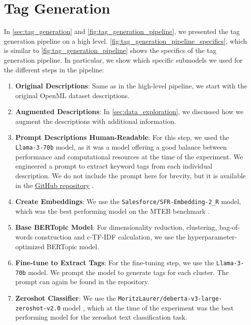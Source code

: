 \section{Tag Generation}
In \cref{sec:tag_generation} and \cref{fig:tag_generation_pipeline}, we presented the tag generation pipeline on a high level. \cref{fig:tag_generation_pipeline_specifics}, which is similar to \cref{fig:tag_generation_pipeline} shows the specifics of the tag generation pipeline. In particular, we show which specific submodels we used for the different steps in the pipeline:
\begin{enumerate}
    \item \textbf{Original Descriptions}: Same as in the high-level pipeline, we start with the original OpenML dataset descriptions.
    \item \textbf{Augmented Descriptions}: In \cref{sec:data_exploration}, we discussed how we augment the descriptions with additional information.
    \item \textbf{Prompt Descriptions Human-Readable}: For this step, we used the \texttt{Llama-3-70b} model, as it was a model offering a good balance between performance and computational resources at the time of the experiment. We engineered a prompt to extract keyword tags from each individual description. We do not include the prompt here for brevity, but it is available in the \href{https://github.com/ivangermanov/openml-tags}{GitHub repository} \cite{germanov_topic_modeling_of_2024}.
    \item \textbf{Create Embeddings}: We use the \texttt{Salesforce/SFR-Embedding-2\_R} model, which was the best performing model on the MTEB benchmark \cite{muennighoff_mteb_2023}.
    \item \textbf{Base BERTopic Model}: For dimensionality reduction, clustering, bag-of-words construction and c-TF-IDF calculation, we use the hyperparameter-optimized BERTopic model.
    \item \textbf{Fine-tune to Extract Tags}: For the fine-tuning step, we use the \texttt{Llama-3-70b} model. We prompt the model to generate tags for each cluster. The prompt can again be found in the repository.
    \item \textbf{Zeroshot Classifier}: We use the \texttt{MoritzLaurer/deberta-v3-large-zeroshot-v2.0} model \cite{noauthor_moritzlaurerdeberta-v3-large-zeroshot-v20_2024}, which at the time of the experiment was the best performing model for the zeroshot text classification task.
\end{enumerate}

